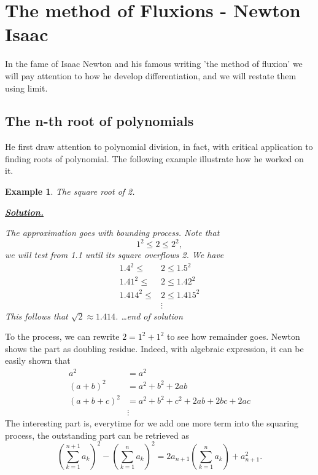 \documentclass[12pt]{article}
\newtheorem*{example}{Example}
\newenvironment{solution}{\begin{snugshade*} \underline{\textbf{Solution.}} \par}{\hfill \textit{\dots end of solution} \end{snugshade*}}
\begin{document}
    \section{The method of Fluxions - Newton Isaac}


    In the fame of Isaac Newton and his famous writing 'the method of fluxion' we will pay attention to how he develop differentiation, and we will restate them using limit.
    \subsection*{The n-th root of polynomials}

    He first draw attention to polynomial division, in fact, with critical application to finding roots of polynomial. The following example illustrate how he worked on it.

    \begin{example}
        The square root of 2.

        \begin{solution}
            The approximation goes with bounding process. Note that \[1^2\leq 2\leq 2^2,\] we will test from 1.1 until its square overflows 2. We have \begin{align*}
                1.4^2\leq &2 \leq 1.5^2\\
                1.41^2\leq &2 \leq 1.42^2\\
                1.414^2\leq &2 \leq 1.415^2\\
                &\vdots
            \end{align*}
            This follows that $\sqrt{2}\approx 1.414$.
        \end{solution}
    \end{example}

    To the process, we can rewrite $2=1^2+1^2$ to see how remainder goes. Newton shows the part as doubling residue. Indeed, with algebraic expression, it can be easily shown that \begin{align*}
        a^2&=a^2\\
        (a+b)^2&=a^2+b^2+2ab\\
        (a+b+c)^2&=a^2+b^2+c^2+2ab+2bc+2ac\\
        &\vdots
    \end{align*}
    The interesting part is, everytime for we add one more term into the squaring process, the outstanding part can be retrieved as \[(\sum_{k=1}^{n+1}a_k)^2-(\sum_{k=1}^{n}a_k)^2=2a_{n+1}(\sum_{k=1}^{n}a_k)+a_{n+1}^2.\]
\end{document}
